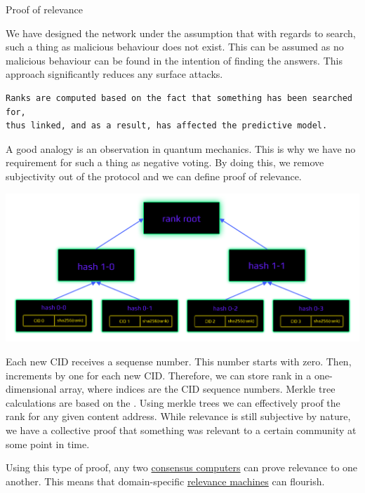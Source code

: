 \documentclass[8pt,oneside]{amsart}
\makeatletter
\newcommand{\linkgreen}[2]{\href{#1}{\color{green}{#2}}}
\renewcommand\subsection{\@startsection{subsection}
                                    {2}{\z@}
                                    {-3.25ex\@plus -1ex \@minus -.2ex}
                                    {0ex \@plus .2ex}
                                    {\play\Large}
                        }
\newcommand{\titleSection}[1]{\subsection{#1}}
\newenvironment{Figure}
  {\par\medskip\noindent\minipage{\linewidth}}
  {\endminipage\par\medskip}
\makeatother
\begin{document}
\titleSection{Proof of relevance}\label{proof-of-relevance}

We have designed the network under the assumption that with regards to search, such a thing as malicious behaviour does not exist. This can be assumed as no malicious behaviour can be found in the intention of finding the answers. This approach significantly reduces any surface attacks.

\begin{lstlisting}
Ranks are computed based on the fact that something has been searched for,
thus linked, and as a result, has affected the predictive model.
\end{lstlisting}

A good analogy is an observation in quantum mechanics. This is why we have no requirement for such a thing as negative voting. By doing this, we remove subjectivity out of the protocol and we can define proof of relevance.

\begin{Figure}
    \centering
    \includegraphics[width=1\textwidth]{rank-tree.png}
\end{Figure}

Each new CID receives a sequense number. This number starts with zero. Then, increments by one for each new CID. Therefore, we can store rank in a one-dimensional array, where indices are the CID sequence numbers. Merkle tree calculations are based on the \linkgreen{https://ipfs.io/ipfs/QmUUTW5gpJx7g5QF3PRkhjkk7jqs3r8EWcuVpZ9dHfx7DE}{RFC-6962 standard}. Using merkle trees we can effectively proof the rank for any given content address. While relevance is still subjective by nature, we have a collective proof that something was relevant to a certain community at some point in time.

Using this type of proof, any two \linkgreen{https://ipfs.io/ipfs/QmdCeixQUHBjGnKfwbB1dxf4X8xnadL8xWmmEnQah5n7x2}{IBC compatible} {\hyperref[consensus-computer]{consensus computers}} can prove relevance to one another. This means that domain-specific {\hyperref[relevance-machine]{relevance machines}} can flourish.
\end{document}
